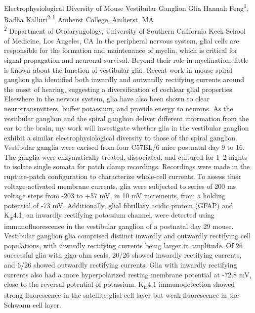 \makeabstract
{ %
Electrophysiological Diversity of Mouse Vestibular Ganglion Glia
}
{ %
Hannah Feng\textsuperscript{1},
Radha Kalluri\textsuperscript{2}
}
{ %
\textsuperscript{1} Amherst College, Amherst, MA\\
\textsuperscript{2} Department of Otolaryngology, University of Southern California Keck School of Medicine, Los Angeles, CA
}
{ %
In the peripheral nervous system, glial cells are responsible for the formation and maintenance of myelin, which is critical for signal propagation and neuronal survival. Beyond their role in myelination, little is known about the function of vestibular glia. Recent work in mouse spiral ganglion glia identified both inwardly and outwardly rectifying currents around the onset of hearing, suggesting a diversification of cochlear glial properties. Elsewhere in the nervous system, glia have also been shown to clear neurotransmitters, buffer potassium, and provide energy to neurons. As the vestibular ganglion and the spiral ganglion deliver different information from the ear to the brain, my work will investigate whether glia in the vestibular ganglion exhibit a similar electrophysiological diversity to those of the spiral ganglion.
}
{ %
Vestibular ganglia were excised from four C57BL/6 mice postnatal day 9 to 16. The ganglia were enzymatically treated, dissociated, and cultured for 1--2 nights to isolate single somata for patch clamp recordings. Recordings were made in the rupture-patch configuration to characterize whole-cell currents. To assess their voltage-activated membrane currents, glia were subjected to series of 200 ms voltage steps from -203 to +57 mV, in 10 mV increments, from a holding potential of -73 mV. Additionally, glial fibrillary acidic protein (GFAP) and K\textsubscript{ir}4.1, an inwardly rectifying potassium channel, were detected using immunofluorescence in the vestibular ganglion of a postnatal day 29 mouse.
}
{ %
Vestibular ganglion glia comprised distinct inwardly and outwardly rectifying cell populations, with inwardly rectifying currents being larger in amplitude. Of 26 successful glia with giga-ohm seals, 20/26 showed inwardly rectifying currents, and 6/26 showed outwardly rectifying currents. Glia with inwardly rectifying currents also had a more hyperpolarized resting membrane potential at -72.8 mV, close to the reversal potential of potassium. K\textsubscript{ir}4.1 immunodetection showed strong fluorescence in the satellite glial cell layer but weak fluorescence in the Schwann cell layer.
}
